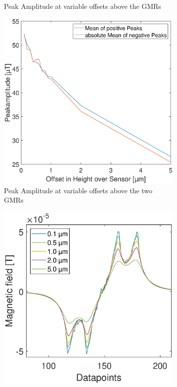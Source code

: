 \begin{figure}[htb!]
\begin{subfigure}[r]{0.49\linewidth}
		\caption{Peak Amplitude at variable offsets above the GMRs}
		\label{fig:sim:off:z:int}
	\end{subfigure}
\vfil
	\begin{subfigure}[r]{0.49\linewidth} 
	\centering
	\includegraphics[clip,trim={0mm 0mm 0mm 0mm}, width=\linewidth]{Ressourcen/Results/OffZ/Offset}
	\caption{Peak Amplitude at variable offsets above the two GMRs}
	\label{fig:sim:off:z:ampl}
\end{subfigure}
	\hfil
\begin{subfigure}[r]{0.49\linewidth} 
	\centering
	\includegraphics[clip,trim={0mm 0mm 0mm 0mm}, width=\linewidth]{Ressourcen/Results/OffZ/Shape_Off_z}

\end{subfigure}
\end{figure}
